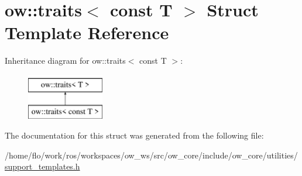 \hypertarget{structow_1_1traits_3_01const_01T_01_4}{}\section{ow\+:\+:traits$<$ const T $>$ Struct Template Reference}
\label{structow_1_1traits_3_01const_01T_01_4}
Inheritance diagram for ow\+:\+:traits$<$ const T $>$\+:\begin{figure}[H]
\begin{center}
\leavevmode
\includegraphics[height=2.000000cm]{de/dea/structow_1_1traits_3_01const_01T_01_4}
\end{center}
\end{figure}


The documentation for this struct was generated from the following file\+:\begin{DoxyCompactItemize}
\item 
/home/flo/work/ros/workspaces/ow\+\_\+ws/src/ow\+\_\+core/include/ow\+\_\+core/utilities/\hyperlink{support__templates_8h}{support\+\_\+templates.\+h}\end{DoxyCompactItemize}
